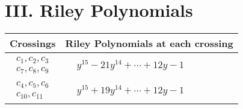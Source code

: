 \documentclass[1p]{elsarticle_modified}
\theoremstyle{definition}
\begin{document}
\centering \section*{ III. Riley Polynomials}
\begin{tabular}{m{50pt}|m{274pt}}
Crossings & \hspace{64pt}Riley Polynomials at each crossing \\
\hline $$\begin{aligned}c_{1},c_{2},c_{3}\\c_{7},c_{8},c_{9}\end{aligned}$$&$\begin{aligned}
&y^{15}-21 y^{14}+\cdots+12 y-1
\end{aligned}$\\
\hline $$\begin{aligned}c_{4},c_{5},c_{6}\\c_{10},c_{11}\end{aligned}$$&$\begin{aligned}
&y^{15}+19 y^{14}+\cdots+12 y-1
\end{aligned}$\\
\hline
\end{tabular}
\vskip 2pc
\end{document}
